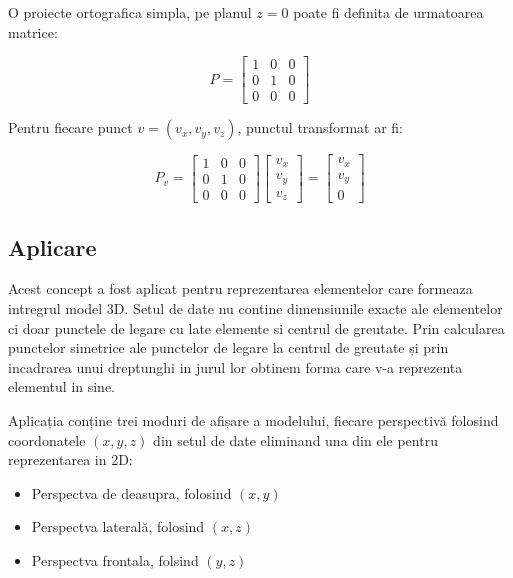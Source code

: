 
O proiecte ortografica simpla, pe planul \(z=0\) poate fi definita de urmatoarea matrice:

\[
P=
  \begin{bmatrix}
    1 & 0 & 0 \\
    0 & 1 & 0 \\
    0 & 0 & 0 
  \end{bmatrix}
\]

Pentru fiecare punct \(v=(v_x,v_y,v_z)\), punctul transformat ar fi:

\[
P_v=
  \begin{bmatrix}
    1 & 0 & 0 \\
    0 & 1 & 0 \\
    0 & 0 & 0 
  \end{bmatrix}
  \begin{bmatrix}
    v_x  \\
    v_y  \\
    v_z  
  \end{bmatrix}
  =
  \begin{bmatrix}
    v_x  \\
    v_y  \\
    0  
  \end{bmatrix}
\]

\subsection{Aplicare}

Acest concept a fost aplicat pentru reprezentarea elementelor care formeaza intregrul model 3D. 
Setul de date nu contine dimensiunile exacte ale elementelor ci doar punctele de legare cu late elemente si centrul de greutate.
Prin calcularea punctelor simetrice ale punctelor de legare la centrul de greutate și prin incadrarea unui dreptunghi in jurul lor
obtinem forma care v-a reprezenta elementul in sine.\newline 

Aplicația conține trei moduri de afișare a modelului, fiecare perspectivă folosind coordonatele \((x,y,z)\) din setul de date 
eliminand una din ele pentru reprezentarea in 2D:
\begin{itemize}
\item Perspectva de deasupra, folosind \((x,y)\)     
\item Perspectva laterală, folosind \((x,z)\)
\item Perspectva frontala, folsind \((y,z)\)
\end{itemize}